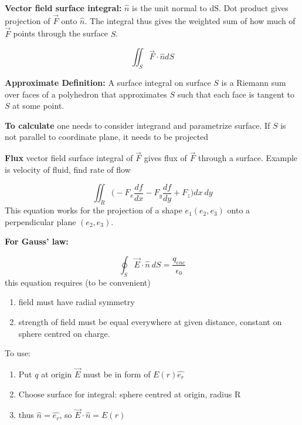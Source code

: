 \textbf{Vector field surface integral: }
$\hat{n}$ is the unit normal to dS. Dot product gives projection of $\vec{F}$ onto $\hat{n}$. The integral thus gives the weighted sum of how much of $\vec{F}$ points through the surface $S$.

\begin{equation}
	\label{}
	\iint_{S}\vec{F}\cdot\hat{n}dS
\end{equation}

\textbf{Approximate Definition: } A surface integral on surface $S$ is a Riemann sum over faces of a polyhedron that approximates $S$ such that each face is tangent to $S$ at some point.


\textbf{To calculate}  one needs to consider integrand and parametrize surface. If $S$ is not parallel to coordinate plane, it needs to be projected


\textbf{Flux} vector field surface integral of $\vec{F}$ gives flux of $\vec{F}$ through a surface. Example is velocity of fluid, find rate of flow

\begin{equation}
	\label{}
	\iint_{R}\bigg(-F_{x}\frac{df}{dx}-F_{y}\frac{df}{dy}+F_{z}\bigg)dx\ dy
\end{equation}
This equation works for the projection of a shape $ e_1(e_2,e_3) $ onto a perpendicular plane $ (e_2,e_3) $.


\hfill
\hfill


\textbf{For Gauss' law:}

\begin{equation}
	\label{}
	\oint_{S}\vec{E}\cdot\hat{n}\ dS=\frac{q_{enc}}{\epsilon_{0}}
\end{equation}
this equation requires (to be convenient)
\begin{enumerate}
	\item field must have radial symmetry
	\item strength of field must be equal everywhere at given distance, constant on sphere centred on charge.
\end{enumerate}
To use:
\begin{enumerate}
	\item Put $q$ at origin $\vec{E}$ must be in form of $E(r)\hat{e_{r}}$
	\item Choose surface for integral: sphere centred at origin, radius R
	\item thus $\hat{n}=\hat{e_{r}}$, so $\vec{E}\cdot\hat{n}=E(r)$
\end{enumerate}


